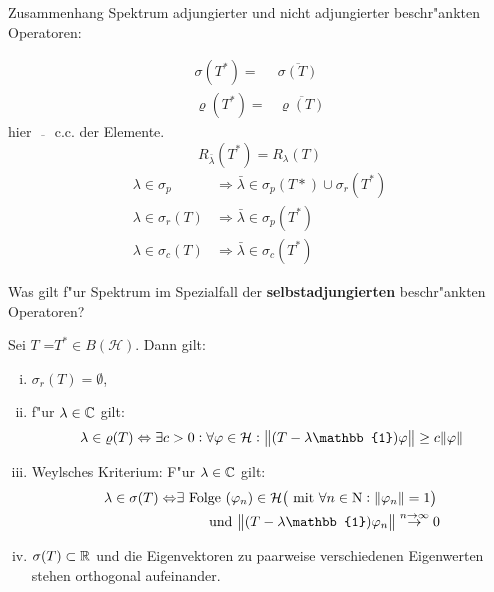 \documentclass[9pt]{article}
\newcommand{\R}[1]{%
	\ifthenelse{\equal{#1}{}}
	{\mathbb{R}}
	{\mathbb{R}^{#1}}}%
\newcommand{\C}[1]{%
	\ifthenelse{\equal{#1}{}}
	{\mathbb{C}}
	{\mathbb{C}^{#1}}}%
\newcommand{\Hi}{\mathcal{H}}
\newcommand{\id}{\mathbb{1}}
\newenvironment{field}{}{\newpage}
\newif\ifnote
\newenvironment{note}{\notetrue}{\notefalse}
\newcommand{\localtag}{}
\newcommand{\globaltag}{}
\newcommand{\uuid}{}
\newcommand{\tags}[1]{
    \ifnote 
        \renewcommand{\localtag}{#1}
    \else
        \renewcommand{\globaltag}{#1}
    \fi 
    }
\newcommand{\xplain}[1]{\renewcommand{\uuid}{#1}}
\begin{document}
	\begin{note}
		\xplain{c8b5665b-208a-481b-bd1b-b865b4bbdfc8}
		\tags{6.3.6}
		
		\begin{field}  %
			Zusammenhang Spektrum adjungierter und nicht adjungierter beschr"ankten Operatoren:
		\end{field}
		
		\begin{field}  %
			\begin{align*}
				\sigma(T^*) =& \overline{\sigma(T)} \\
				\varrho(T^*) =& \overline{\varrho(T)}
			\end{align*}
			hier $\overline{\quad}$ c.c. der Elemente.
			\begin{equation*}
				R_{\bar{\lambda}}(T^*)= R_\lambda(T)
			\end{equation*}
			\begin{align*}
				\lambda \in \sigma_p &\Rightarrow \bar{\lambda} \in \sigma_p(T*) \cup \sigma_r(T^*) \\
				\lambda \in \sigma_r(T) & \Rightarrow \bar{\lambda} \in \sigma_p(T^*) \\
				\lambda \in \sigma_c(T) & \Rightarrow \bar{\lambda} \in \sigma_c(T^*) 
			\end{align*}
		\end{field}
	\end{note}
	\begin{note}
		\xplain{fbceb1aa-ca13-4f80-ac7e-dfcdc6b9b554}
		\tags{6.4}
		
		\begin{field}  %
			Was gilt f"ur Spektrum im Spezialfall der \textbf{selbstadjungierten} beschr"ankten Operatoren? 
		\end{field}
		
		\begin{field}  %
			Sei $T$ =$T^* \in B(\Hi)$. Dann gilt:
				\begin{enumerate}[i)]
					\item $\sigma_r(T) = \emptyset$,
					\item f"ur $\lambda \in \C{}$ gilt:
					\begin{equation*}
						\lambda \in \varrho(T) \Leftrightarrow \exists c>0: \forall \varphi \in \Hi: \norm{\qty(T-\lambda\id)\varphi}
						\geq c\norm{\varphi}
					\end{equation*}
					\item Weylsches Kriterium: F"ur $\lambda \in \C{}$ gilt:
						\begin{align*}
							\lambda \in \sigma(T) \Leftrightarrow& \exists \text{ Folge } (\varphi_n) \in \Hi \qty(\text{ mit }
							\forall n \in \N{}: \norm{\varphi_n}=1) \\ &\qquad\text{ und }\norm{(T-\lambda \id)\varphi_n} \overset{n\rightarrow \infty}{\rightarrow} 0 
						\end{align*}
						\item $\sigma(T)\subset \R{}$ und die Eigenvektoren zu paarweise verschiedenen Eigenwerten stehen orthogonal aufeinander. 
				\end{enumerate}
		\end{field}
	\end{note}
\end{document}
